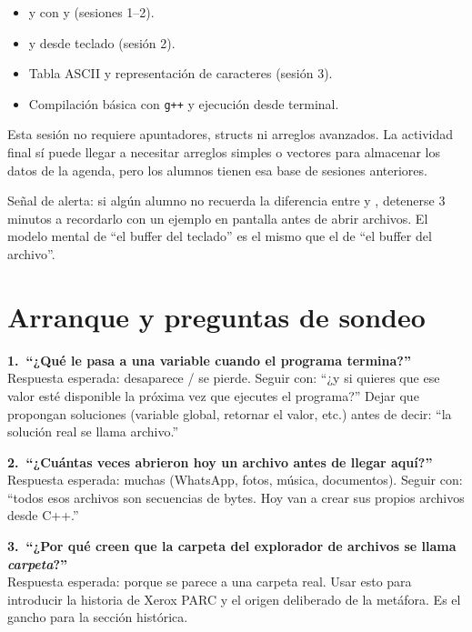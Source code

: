 \documentclass[12pt, oneside]{article}
\begin{document}
\begin{itemize}
  \item {} y  con \cpp{>>} y \cpp{<<} (sesiones 1--2).
  \item {} y  desde teclado (sesión 2).
  \item Tabla ASCII y representación de caracteres (sesión 3).
  \item Compilación básica con \texttt{g++} y ejecución desde terminal.
\end{itemize}

\begin{notaprofesor}
  Esta sesión no requiere apuntadores, structs ni arreglos avanzados.  La
  actividad final sí puede llegar a necesitar arreglos simples o vectores
  para almacenar los datos de la agenda, pero los alumnos tienen esa base
  de sesiones anteriores.
  \par\smallskip
  Señal de alerta: si algún alumno no recuerda la diferencia entre
   y , detenerse 3 minutos a recordarlo con un
  ejemplo en pantalla antes de abrir archivos.  El modelo mental de
  ``el buffer del teclado'' es el mismo que el de ``el buffer del archivo''.
\end{notaprofesor}

\section{Arranque y preguntas de sondeo}

\begin{notaprofesor}

  \textbf{1.\ ``¿Qué le pasa a una variable cuando el programa termina?''}\\
  Respuesta esperada: desaparece / se pierde.  Seguir con: ``¿y si quieres
  que ese valor esté disponible la próxima vez que ejecutes el programa?''
  Dejar que propongan soluciones (variable global, retornar el valor, etc.)
  antes de decir: ``la solución real se llama archivo.''

  \medskip
  \textbf{2.\ ``¿Cuántas veces abrieron hoy un archivo antes de llegar
  aquí?''}\\
  Respuesta esperada: muchas (WhatsApp, fotos, música, documentos).
  Seguir con: ``todos esos archivos son secuencias de bytes.  Hoy van a
  crear sus propios archivos desde C++.''

  \medskip
  \textbf{3.\ ``¿Por qué creen que la carpeta del explorador de archivos
  se llama \textit{carpeta}?''}\\
  Respuesta esperada: porque se parece a una carpeta real.  Usar esto
  para introducir la historia de Xerox PARC y el origen deliberado de la
  metáfora.  Es el gancho para la sección histórica.

\end{notaprofesor}
\end{document}
